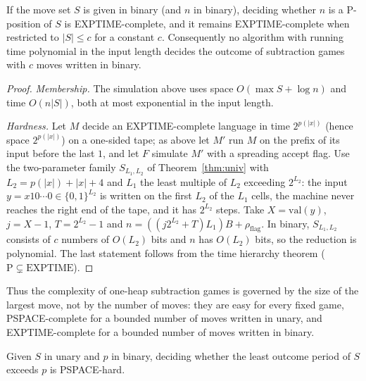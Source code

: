 \begin{theorem}\label{thm:exptime}
If the move set $S$ is given in binary (and $n$ in binary), deciding whether $n$ is a P-position of
$S$ is EXPTIME-complete, and it remains EXPTIME-complete when restricted to $|S|\le c$ for a constant
$c$.  Consequently no algorithm with running time polynomial in the input length decides the outcome
of subtraction games with $c$ moves written in binary.
\end{theorem}

\begin{proof}
\emph{Membership.}  The simulation above uses space $O(\max S+\log n)$ and time $O(n|S|)$, both at
most exponential in the input length.

\emph{Hardness.}  Let $M$ decide an EXPTIME-complete language in time $2^{p(|x|)}$ (hence space
$2^{p(|x|)}$) on a one-sided tape; as above let $M'$ run $M$ on the prefix of its input before the last
$1$, and let $F$ simulate $M'$ with a spreading accept flag.  Use the two-parameter family
$S_{L_1,L_2}$ of Theorem~\ref{thm:univ} with $L_2=p(|x|)+|x|+4$ and $L_1$ the least multiple of $L_2$
exceeding $2^{L_2}$: the input $y=x10\cdots0\in\{0,1\}^{L_2}$ is written on the first $L_2$ of the $L_1$
cells, the machine never reaches the right end of the tape, and it has $2^{L_2}$ steps.  Take
$X=\mathrm{val}(y)$, $j=X-1$, $T=2^{L_2}-1$ and $n=((j2^{L_2}+T)L_1)B+\rho_{\mathrm{flag}}$.  In binary,
$S_{L_1,L_2}$ consists of $c$ numbers of $O(L_2)$ bits and $n$ has $O(L_2)$ bits, so the reduction is
polynomial.  The last statement follows from the time hierarchy theorem
($\mathrm{P}\subsetneq\mathrm{EXPTIME}$).
\end{proof}

Thus the complexity of one-heap subtraction games is governed by the size of the largest move, not
by the number of moves: they are easy for every fixed game, PSPACE-complete for a bounded number of
moves written in unary, and EXPTIME-complete for a bounded number of moves written in binary.

\begin{corollary}\label{cor:perhard}
Given $S$ in unary and $p$ in binary, deciding whether the least outcome period of $S$ exceeds $p$
is PSPACE-hard.
\end{corollary}

